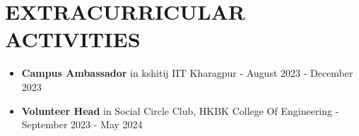 \documentclass[letterpaper,11pt]{article}
\newcommand{\resumeItem}[1]{
  \item\small{
    {#1 \vspace{-1pt}}
  }
}
\newcommand{\resumeItemListStart}{\begin{itemize}[leftmargin=0.1in]}
\newcommand{\resumeItemListEnd}{\end{itemize}\vspace{-5pt}}
\begin{document}
 





\section{\color{airforceblue}EXTRACURRICULAR ACTIVITIES}
    
      \resumeItemListStart
        \resumeItem{\normalsize{\textbf{Campus Ambassador} in kshitij IIT Kharagpur - {August 2023 - December 2023} }} 
        \vspace{-5pt}
        
        \resumeItem{\normalsize{\textbf{Volunteer Head} in Social Circle Club, HKBK College Of Engineering - } {September 2023 - May 2024}}    
        \vspace{-5pt}

      \resumeItemListEnd 
      
\vspace{-12pt}
\end{document}

